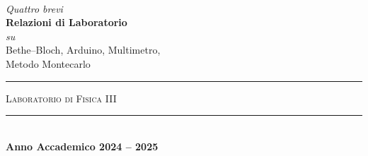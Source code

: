 \begin{titlingpage}
\begin{center}
        \\[20pt]
        {\large\itshape Quattro brevi}
        \\[5pt]
        {\Huge\bfseries Relazioni di Laboratorio}
        \\[3pt]
        {\large\textit{su}\\Bethe--Bloch, Arduino, Multimetro,\\Metodo Montecarlo}
        \\
        \vfill
        \centering
        \begin{minipage}[h]{0.4\textwidth}
            \centering
            \hrule
            \vspace{10pt}
            \textsc{Laboratorio di Fisica III}
            \vspace{10pt}
            \hrule
        \end{minipage}
        \\[50pt]
        \vspace{\fill}
        \vspace{30pt}
        \doublerule
        \vspace{10pt}
        \normalsize
        \textbf{Anno Accademico 2024 -- 2025}
    \end{center}
\end{titlingpage}
\restoregeometry